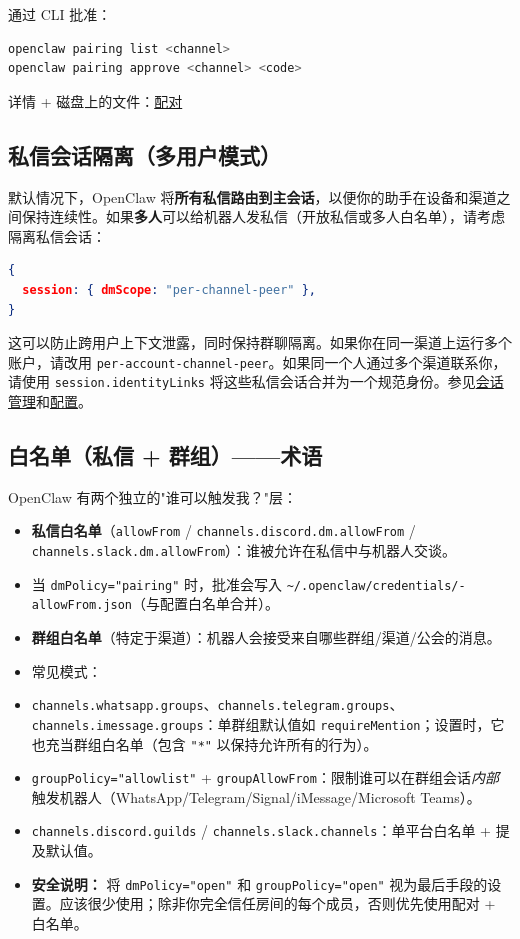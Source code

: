通过 CLI 批准：

\begin{lstlisting}[language=bash]
openclaw pairing list <channel>
openclaw pairing approve <channel> <code>
\end{lstlisting}


详情 + 磁盘上的文件：\href{/channels/pairing}{配对}

\subsection{私信会话隔离（多用户模式）}


默认情况下，OpenClaw 将\textbf{所有私信路由到主会话}，以便你的助手在设备和渠道之间保持连续性。如果\textbf{多人}可以给机器人发私信（开放私信或多人白名单），请考虑隔离私信会话：

\begin{lstlisting}[language=json]
{
  session: { dmScope: "per-channel-peer" },
}
\end{lstlisting}


这可以防止跨用户上下文泄露，同时保持群聊隔离。如果你在同一渠道上运行多个账户，请改用 \texttt{per-account-channel-peer}。如果同一个人通过多个渠道联系你，请使用 \texttt{session.identityLinks} 将这些私信会话合并为一个规范身份。参见\href{/concepts/session}{会话管理}和\href{/gateway/configuration}{配置}。

\subsection{白名单（私信 + 群组）——术语}


OpenClaw 有两个独立的"谁可以触发我？"层：

\begin{itemize}
  \item \textbf{私信白名单}（\texttt{allowFrom} / \texttt{channels.discord.dm.allowFrom} / \texttt{channels.slack.dm.allowFrom}）：谁被允许在私信中与机器人交谈。
  \item 当 \texttt{dmPolicy="pairing"} 时，批准会写入 \texttt{\textasciitilde{}/.openclaw/credentials/-allowFrom.json}（与配置白名单合并）。
  \item \textbf{群组白名单}（特定于渠道）：机器人会接受来自哪些群组/渠道/公会的消息。
  \item 常见模式：
  \item \texttt{channels.whatsapp.groups}、\texttt{channels.telegram.groups}、\texttt{channels.imessage.groups}：单群组默认值如 \texttt{requireMention}；设置时，它也充当群组白名单（包含 \texttt{"*"} 以保持允许所有的行为）。
  \item \texttt{groupPolicy="allowlist"} + \texttt{groupAllowFrom}：限制谁可以在群组会话\textit{内部}触发机器人（WhatsApp/Telegram/Signal/iMessage/Microsoft Teams）。
  \item \texttt{channels.discord.guilds} / \texttt{channels.slack.channels}：单平台白名单 + 提及默认值。
  \item \textbf{安全说明：} 将 \texttt{dmPolicy="open"} 和 \texttt{groupPolicy="open"} 视为最后手段的设置。应该很少使用；除非你完全信任房间的每个成员，否则优先使用配对 + 白名单。
\end{itemize}


